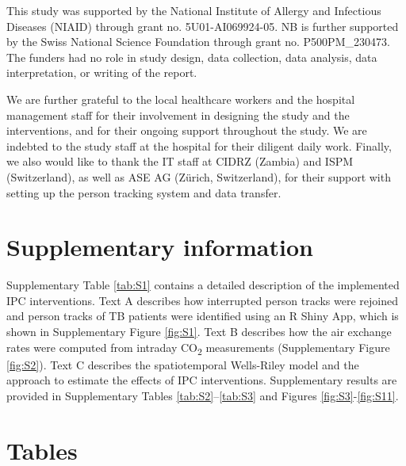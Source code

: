 \documentclass[11pt]{article}
\begin{document}
This study was supported by the National Institute of Allergy and Infectious Diseases (NIAID) through grant no. 5U01-AI069924-05. NB is further supported by the Swiss National Science Foundation through grant no. P500PM\_230473. The funders had no role in study design, data collection, data analysis, data interpretation, or writing of the report.

We are further grateful to the local healthcare workers and the hospital management staff for their involvement in designing the study and the interventions, and for their ongoing support throughout the study. We are indebted to the study staff at the hospital for their diligent daily work. Finally, we also would like to thank the IT staff at CIDRZ (Zambia) and ISPM (Switzerland), as well as ASE AG (Zürich, Switzerland), for their support with setting up the person tracking system and data transfer.

\section{Supplementary information}\label{supplementary-information}

Supplementary Table \ref{tab:S1} contains a detailed description of the implemented IPC interventions. Text A describes how interrupted person tracks were rejoined and person tracks of TB patients were identified using an R Shiny App, which is shown in Supplementary Figure \ref{fig:S1}. Text B describes how the air exchange rates were computed from intraday CO\textsubscript{2} measurements (Supplementary Figure \ref{fig:S2}). Text C describes the spatiotemporal Wells-Riley model and the approach to estimate the effects of IPC interventions. Supplementary results are provided in Supplementary Tables \ref{tab:S2}--\ref{tab:S3} and Figures \ref{fig:S3}-\ref{fig:S11}.

\section{Tables}\label{tables}

\label{tab:1}
\end{document}
